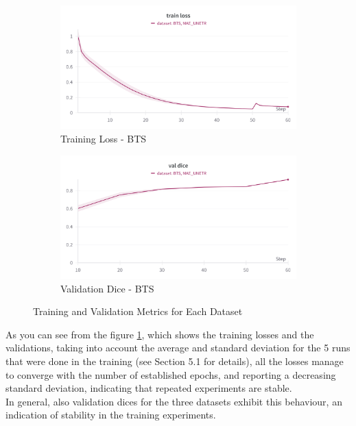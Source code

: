 \begin{figure}[htbp]
    \begin{subfigure}{0.45\textwidth}
        \centering
        \includegraphics[width=\linewidth]{images/mae_unetr/bts_train_loss.png}
        \caption{Training Loss - BTS}
    \end{subfigure}
    \hfill
    \begin{subfigure}{0.45\textwidth}
        \centering
        \includegraphics[width=\linewidth]{images/mae_unetr/bts_val_dice.png}
        \caption{Validation Dice - BTS}
    \end{subfigure}
    
    \caption{Training and Validation Metrics for Each Dataset}
    \label{fig:training-validation-mae}
\end{figure}

As you can see from the figure \ref{fig:training-validation-mae}, which shows the training losses and the validations, taking into account the average and standard deviation for the 5 runs that were done in the training (see Section 5.1 for details), all the losses manage to converge with the number of established epochs, and reporting a decreasing standard deviation, indicating that repeated experiments are stable.\\In general, also validation dices for the three datasets exhibit this behaviour, an indication of stability in the training experiments.

